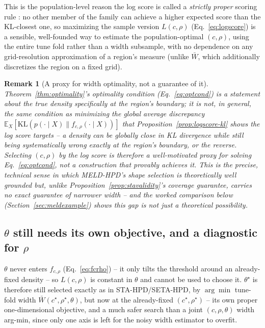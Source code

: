 \documentclass[11pt]{article}
\newtheorem{remark}{Remark}[section]
\begin{document}
This is the population-level reason the log score is called a \emph{strictly proper} scoring rule
\cite{gneiting2007strictly}: no other member of the family can achieve a higher expected score than
the KL-closest one, so maximizing the sample version $L(c,\rho)$ (Eq.~\ref{eq:logscore}) is a
sensible, well-founded way to estimate the population-optimal $(c,\rho)$, using the entire tune
fold rather than a width subsample, with no dependence on any grid-resolution approximation of a
region's measure (unlike $\bar W$, which additionally discretizes the region on a fixed grid).

\begin{remark}[A proxy for width optimality, not a guarantee of it]
\label{rem:logscoreproxy}
Theorem~\ref{thm:optimality}'s optimality condition (Eq.~\ref{eq:optcond}) is a statement about the
true density specifically \emph{at the region's boundary}; it is not, in general, the same
condition as minimizing the \emph{global} average discrepancy $\mathbb E_X[\mathrm{KL}(p(\cdot\mid
X)\|f_{c,\rho}(\cdot\mid X))]$ that Proposition~\ref{prop:logscore-kl} shows the log score targets
-- a density can be globally close in KL divergence while still being systematically wrong exactly
at the region's boundary, or the reverse. Selecting $(c,\rho)$ by the log score is therefore a
well-motivated \emph{proxy} for solving Eq.~\eqref{eq:optcond}, not a construction that provably
achieves it. This is the precise, technical sense in which MELD-HPD's shape selection is
theoretically well grounded but, unlike Proposition~\ref{prop:stavalidity}'s coverage guarantee,
carries no exact guarantee of narrower width -- and the worked comparison below
(Section~\ref{sec:meldexample}) shows this gap is not just a theoretical possibility.
\end{remark}

\subsection{$\theta$ still needs its own objective, and a diagnostic for $\rho$}

$\theta$ never enters $f_{c,\rho}$ (Eq.~\ref{eq:fcrho}) -- it only tilts the threshold around an
already-fixed density -- so $L(c,\rho)$ is constant in $\theta$ and cannot be used to choose it.
$\theta^\star$ is therefore still selected exactly as in STA-HPD/SETA-HPD, by $\arg\min$ tune-fold
width $\bar W(c^\star,\rho^\star,\theta)$, but now at the already-fixed $(c^\star,\rho^\star)$ --
its own proper one-dimensional objective, and a much safer search than a joint $(c,\rho,\theta)$
width arg-min, since only one axis is left for the noisy width estimator to overfit.
\end{document}
